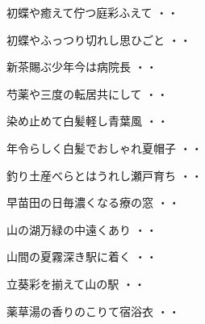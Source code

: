 \begin{shiika}初蝶や癒えて佇つ庭彩ふえて
\hfill{・・}\end{shiika}
\vspace{0.6cm}
\begin{shiika}初蝶やふっつり切れし思ひごと
\hfill{・・}\end{shiika}
\vspace{0.6cm}
\begin{shiika}新茶賜ぶ少年今は病院長
\hfill{・・}\end{shiika}
\vspace{0.6cm}
\begin{shiika}芍薬や三度の転居共にして
\hfill{・・}\end{shiika}
\vspace{0.6cm}
\begin{shiika}染め止めて白髪軽し青葉風
\hfill{・・}\end{shiika}
\vspace{0.6cm}
\begin{shiika}年令らしく白髪でおしゃれ夏帽子
\hfill{・・}\end{shiika}
\vspace{0.6cm}
\begin{shiika}釣り土産べらとはうれし瀬戸育ち
\hfill{・・}\end{shiika}
\vspace{0.6cm}
\begin{shiika}早苗田の日毎濃くなる療の窓
\hfill{・・}\end{shiika}
\vspace{0.6cm}
\begin{shiika}山の湖万緑の中遠くあり
\hfill{・・}\end{shiika}
\vspace{0.6cm}
\begin{shiika}山間の夏霧深き駅に着く
\hfill{・・}\end{shiika}
\vspace{0.6cm}
\begin{shiika}立葵彩を揃えて山の駅
\hfill{・・}\end{shiika}
\vspace{0.6cm}
\begin{shiika}薬草湯の香りのこりて宿浴衣
\hfill{・・}\end{shiika}
